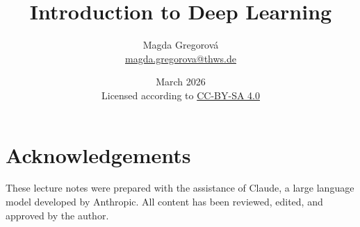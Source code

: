 \documentclass[12pt, a4paper]{scrartcl}
\title{Introduction to Deep Learning}
\author{Magda Gregorová\\
{\small \href{mailto:magda.gregorova@thws.de}{magda.gregorova@thws.de}}}
\date{{\small March 2026 \\[0.3em]
Licensed according to 
\href{https://creativecommons.org/licenses/by-sa/4.0}{CC-BY-SA 4.0}}}
\begin{document}
\maketitle
\tableofcontents
\newpage





\section*{Acknowledgements}
These lecture notes were prepared with the assistance of Claude, a large language model developed by Anthropic. All content has been reviewed, edited, and approved by the author.

\newpage
\printbibliography[heading=bibintoc, title={References}]
\end{document}
